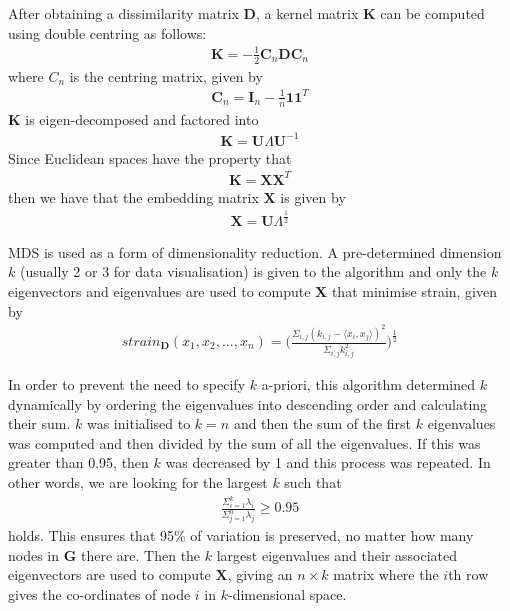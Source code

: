 \documentclass{report}
\begin{document}
After obtaining a dissimilarity matrix $\textbf{D}$, a kernel matrix $\textbf{K}$ can be computed using double centring as follows:
\begin{align*}
\textbf{K} = -\frac{1}{2} \textbf{C}_n \textbf{D} \textbf{C}_n
\end{align*} 
where $C_n$ is the centring matrix, given by
\begin{align*}
\textbf{C}_n = \textbf{I}_n - \frac{1}{n} \textbf{1} \textbf{1}^T
\end{align*}
$\textbf{K}$ is eigen-decomposed and factored into
\begin{align*}
\textbf{K} = \textbf{U} \Lambda \textbf{U}^{-1}
\end{align*}
Since Euclidean spaces have the property that
\begin{align*}
\textbf{K} = \textbf{X} \textbf{X}^T
\end{align*}
then we have that the embedding matrix $\textbf{X}$ is given by
\begin{align*}
\textbf{X} = \textbf{U} \Lambda^{\frac{1}{2}}
\end{align*}

MDS is used as a form of dimensionality reduction. A pre-determined dimension $k$ (usually 2 or 3 for data visualisation) is given to the algorithm and only the $k$ eigenvectors and eigenvalues are used to compute $\textbf{X}$ that minimise strain, given by
\begin{align*}
strain_{\textbf{D}} (x_1, x_2, ..., x_n) = \Bigg ( \frac{\Sigma_{i,j}(k_{i,j} - \langle x_i,x_j \rangle)^2}{\Sigma_{i,j}k^2_{i,j}} \Bigg ) ^ {\frac{1}{2}} 
\end{align*}

In order to prevent the need to specify $k$ a-priori, this algorithm determined $k$ dynamically by ordering the eigenvalues into descending order and calculating their sum. $k$ was initialised to $k=n$ and then the sum of the first $k$ eigenvalues was computed and then divided by the sum of all the eigenvalues. If this was greater than 0.95, then $k$ was decreased by 1 and this process was repeated. In other words, we are looking for the largest $k$ such that
\begin{align*}
\frac{\Sigma_{i=1}^k \lambda_i}{\Sigma_{j=1}^n \lambda_j} \geq 0.95
\end{align*}
holds. This ensures that 95\% of variation is preserved, no matter how many nodes in $\textbf{G}$ there are. Then the $k$ largest eigenvalues and their associated eigenvectors are used to compute $\textbf{X}$, giving an $n\times k$ matrix where the $i$th row gives the co-ordinates of node $i$ in $k$-dimensional space.
\end{document}

